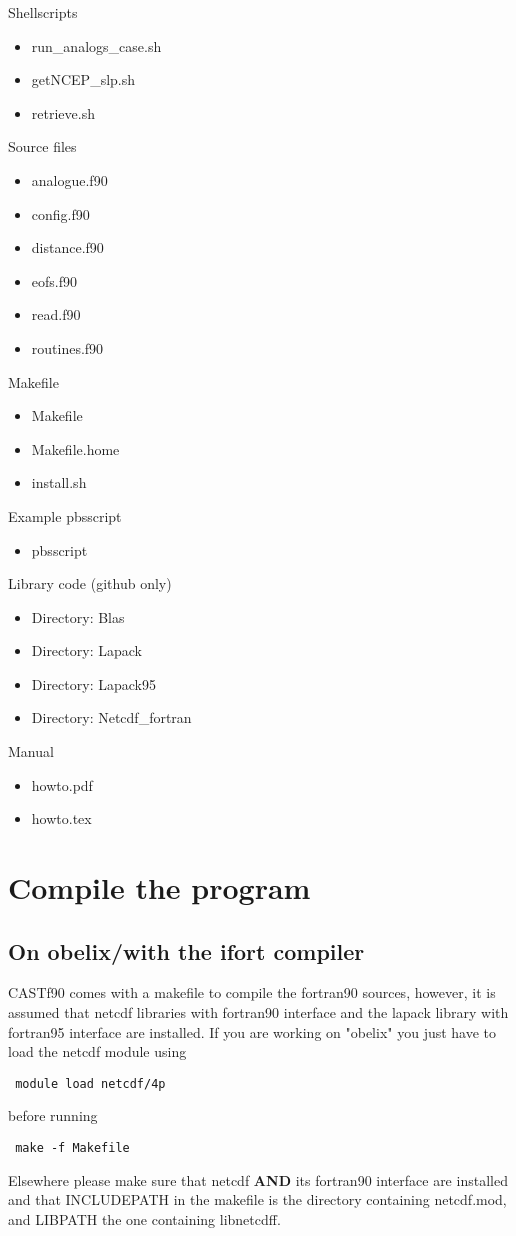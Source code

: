 \documentclass[11p,a4paper]{article}
\begin{document}
Shellscripts
\begin{itemize}
 \item run\_analogs\_case.sh
 \item getNCEP\_slp.sh 
 \item retrieve.sh
\end{itemize}
Source files
\begin{itemize}
 \item analogue.f90  
 \item config.f90  
 \item distance.f90  
 \item eofs.f90  
 \item read.f90  
 \item routines.f90 
\end{itemize}
Makefile
\begin{itemize}
 \item Makefile
 \item Makefile.home
 \item install.sh
\end{itemize}
Example pbsscript
\begin{itemize}
 \item pbsscript
\end{itemize}
Library code (github only)
\begin{itemize}
 \item Directory: Blas
 \item Directory: Lapack
 \item Directory: Lapack95
 \item Directory: Netcdf\_fortran
\end{itemize}
Manual
\begin{itemize}
 \item howto.pdf
 \item howto.tex
\end{itemize}

\section{Compile the program}
\label{sec:compil}
\subsection{On obelix/with the ifort compiler}
CASTf90 comes with a makefile to compile the fortran90 sources, however, it is assumed that netcdf libraries with fortran90 interface and the lapack library with fortran95 interface are installed.
If you are working on "obelix" you just have to load the netcdf module using
\begin{verbatim}
 module load netcdf/4p
\end{verbatim}
before running 
\begin{verbatim}
 make -f Makefile
\end{verbatim}
Elsewhere please make sure that netcdf \textbf{AND} its fortran90 interface are installed and that INCLUDEPATH in the makefile is the directory containing netcdf.mod, and LIBPATH the one containing libnetcdff. 
\end{document}
